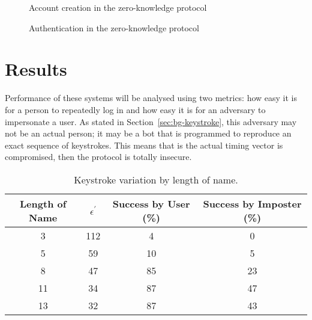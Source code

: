 \documentclass[11pt]{article}
\begin{document}
\begin{figure}
\centering
{}
\caption{Account creation in the zero-knowledge protocol}
\label{fig:zk_new}
\end{figure}

\begin{figure}
\centering
{}
\caption{Authentication in the zero-knowledge protocol}
\label{fig:zk_auth}
\end{figure}


\section{Results}
\label{sec:results}
Performance of these systems will be analysed using two metrics: how easy it is for a person to repeatedly log in and how easy it is for an adversary to impersonate a user. As stated in Section~\ref{sec:bg-keystroke}, this adversary may not be an actual person; it may be a bot that is programmed to reproduce an exact sequence of keystrokes. This means that is the actual timing vector is compromised, then the protocol is totally insecure.

\begin{table}[h!]
\centering
\begin{tabular}{||c c c c||} 
 \hline
 Length of Name & $\epsilon^{'}$ & Success by User (\%) & Success by Imposter (\%) \\ [0.5ex] 
 \hline\hline
 3 & 112 & 4 & 0 \\ 
 5 & 59 & 10 & 5 \\
 8 & 47 & 85 & 23 \\ 
 11 & 34 & 87 & 47 \\
 13 & 32 & 87 & 43 \\ [1ex] 
 \hline
\end{tabular}
\caption{Keystroke variation by length of name.}
\label{table:1}
\end{table}
\end{document}
